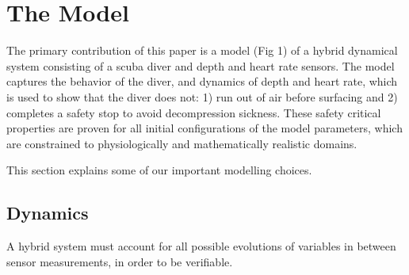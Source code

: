 \documentclass[sigconf,screen]{acmart}
\begin{document}
 




\section{The Model}

The primary contribution of this paper is a model (Fig 1) of a hybrid dynamical system consisting of a scuba diver and depth and heart rate sensors. The model captures the behavior of the diver, and dynamics of depth and heart rate, which is used to show that the diver does not: 1) run out of air before surfacing and 2) completes a safety stop to avoid decompression sickness. These safety critical properties are proven for all initial configurations of the model parameters, which are constrained to physiologically and mathematically realistic domains.

This section explains some of our important 
modelling choices.

\subsection{Dynamics}
A hybrid system must account for all possible evolutions of variables in between sensor measurements, in order to be verifiable. 
\end{document}
